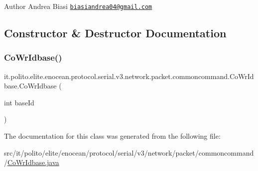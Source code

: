 \begin{DoxyAuthor}{Author}
Andrea Biasi \href{mailto:biasiandrea04@gmail.com}{\tt biasiandrea04@gmail.\+com} 
\end{DoxyAuthor}


\subsection{Constructor \& Destructor Documentation}
\hypertarget{classit_1_1polito_1_1elite_1_1enocean_1_1protocol_1_1serial_1_1v3_1_1network_1_1packet_1_1commoncommand_1_1_co_wr_idbase_a93fe11ee914b480b19aa12128bb01dc3}{}\label{classit_1_1polito_1_1elite_1_1enocean_1_1protocol_1_1serial_1_1v3_1_1network_1_1packet_1_1commoncommand_1_1_co_wr_idbase_a93fe11ee914b480b19aa12128bb01dc3} 
\subsubsection{\texorpdfstring{Co\+Wr\+Idbase()}{CoWrIdbase()}}
{\footnotesize\ttfamily it.\+polito.\+elite.\+enocean.\+protocol.\+serial.\+v3.\+network.\+packet.\+commoncommand.\+Co\+Wr\+Idbase.\+Co\+Wr\+Idbase (\begin{DoxyParamCaption}\item[{int}]{base\+Id }\end{DoxyParamCaption})}



The documentation for this class was generated from the following file\+:\begin{DoxyCompactItemize}
\item 
src/it/polito/elite/enocean/protocol/serial/v3/network/packet/commoncommand/\hyperlink{_co_wr_idbase_8java}{Co\+Wr\+Idbase.\+java}\end{DoxyCompactItemize}
